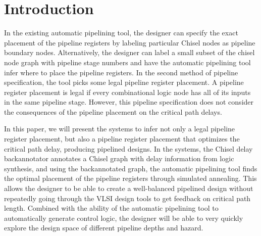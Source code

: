 \section{Introduction}
In the existing automatic pipelining tool, the designer can specify the exact placement of the pipeline registers by labeling particular Chisel nodes as pipeline boundary nodes. Alternatively, the designer can label a small subset of the chisel node graph with pipeline stage numbers and have the automatic pipelining tool infer where to place the pipeline registers. In the second method of pipeline specification, the tool picks some legal pipeline register placement. A pipeline register placement is legal if every combinational logic node has all of its inputs in the same pipeline stage. However, this pipeline specification does not consider the consequences of the pipeline placement on the critical path delays.

In this paper, we will present the systems to infer not only a legal pipeline register placement, but also a pipeline register placement that optimizes the critical path delay, producing pipelined designs. In the systems, the Chisel delay backannotator annotates a Chisel graph with delay information from logic synthesis, and using the backannotated graph, the automatic pipelining tool finds the optimal placement of the pipeline registers through simulated annealing. This allows the designer to be able to create a well-balanced pipelined design without repeatedly going through the VLSI design tools to get feedback on critical path length. Combined with the ability of the automatic pipelining tool to automatically generate control logic, the designer will be able to very quickly explore the design space of different pipeline depths and hazard. 

